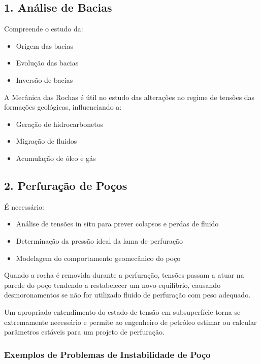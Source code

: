 \documentclass[12pt,a4paper,twoside]{book}
\begin{document}
\subsection{1. Análise de Bacias}

Compreende o estudo da:
\begin{itemize}
    \item Origem das bacias
    \item Evolução das bacias
    \item Inversão de bacias
\end{itemize}

A Mecânica das Rochas é útil no estudo das alterações no regime de tensões das formações geológicas, 
influenciando a:
\begin{itemize}
    \item Geração de hidrocarbonetos
    \item Migração de fluidos
    \item Acumulação de óleo e gás
\end{itemize}

\subsection{2. Perfuração de Poços}

É necessário:
\begin{itemize}
    \item Análise de tensões in situ para prever colapsos e perdas de fluido
    \item Determinação da pressão ideal da lama de perfuração
    \item Modelagem do comportamento geomecânico do poço
\end{itemize}

Quando a rocha é removida durante a perfuração, tensões passam a atuar na parede do poço tendendo 
a restabelecer um novo equilíbrio, causando desmoronamentos se não for utilizado fluido de perfuração 
com peso adequado.

Um apropriado entendimento do estado de tensão em subsuperfície torna-se extremamente necessário 
e permite ao engenheiro de petróleo estimar ou calcular parâmetros estáveis para um projeto de perfuração.

\subsubsection{Exemplos de Problemas de Instabilidade de Poço}
\end{document}
